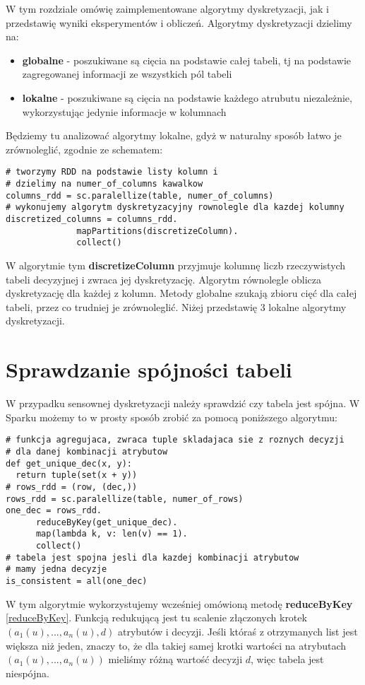 \documentclass[magisterska]{pracamgr}
\theoremstyle{plain}
\theoremstyle{definition}
\theoremstyle{remark}
\begin{document}
W tym rozdziale omówię zaimplementowane algorytmy dyskretyzacji, jak i przedstawię wyniki eksperymentów i obliczeń.
Algorytmy dyskretyzacji dzielimy na:
\begin{itemize}
 \item \textbf{globalne} - poszukiwane są cięcia na podstawie całej tabeli, tj na podstawie zagregowanej informacji ze wszystkich pól tabeli
 \item \textbf{lokalne} - poszukiwane są cięcia na podstawie każdego atrubutu niezależnie, wykorzystując jedynie informacje w kolumnach
\end{itemize}
Będziemy tu analizować algorytmy lokalne, gdyż
w naturalny sposób łatwo je zrównoleglić, zgodnie ze schematem:
\begin{lstlisting}
# tworzymy RDD na podstawie listy kolumn i 
# dzielimy na numer_of_columns kawalkow
columns_rdd = sc.paralellize(table, numer_of_columns)
# wykonujemy algorytm dyskretyzacyjny rownolegle dla kazdej kolumny
discretized_columns = columns_rdd.
		      mapPartitions(discretizeColumn).
		      collect()
\end{lstlisting}
W algorytmie tym \textbf{discretizeColumn} przyjmuje kolumnę liczb rzeczywistych tabeli decyzyjnej i zwraca
jej dyskretyzację. Algorytm równolegle oblicza dyskretyzację dla każdej z kolumn.
Metody globalne szukają zbioru cięć dla całej tabeli, przez co trudniej je zrównoleglić.
Niżej przedstawię 3 lokalne algorytmy dyskretyzacji.

\section{Sprawdzanie spójności tabeli}
W przypadku sensownej dyskretyzacji należy sprawdzić czy tabela jest spójna. W Sparku możemy 
to w prosty sposób zrobić za pomocą poniższego algorytmu:
\begin{lstlisting}
# funkcja agregujaca, zwraca tuple skladajaca sie z roznych decyzji
# dla danej kombinacji atrybutow
def get_unique_dec(x, y):
  return tuple(set(x + y))
# rows_rdd = (row, (dec,))
rows_rdd = sc.paralellize(table, numer_of_rows)
one_dec = rows_rdd.
	  reduceByKey(get_unique_dec).
	  map(lambda k, v: len(v) == 1).
	  collect()
# tabela jest spojna jesli dla kazdej kombinacji atrybutow
# mamy jedna decyzje
is_consistent = all(one_dec)
\end{lstlisting}
W tym algorytmie wykorzystujemy wcześniej omówioną metodę \textbf{reduceByKey} \ref{reduceByKey}. Funkcją redukującą jest tu scalenie
złączonych krotek $(a_1(u), ..., a_n(u), d)$ atrybutów i decyzji. Jeśli któraś z otrzymanych list jest większa niż jeden, znaczy to, że 
dla takiej samej krotki wartości na atrybutach $(a_1(u), ..., a_n(u))$ mieliśmy różną wartość decyzji $d$, więc tabela jest niespójna.
\end{document}
